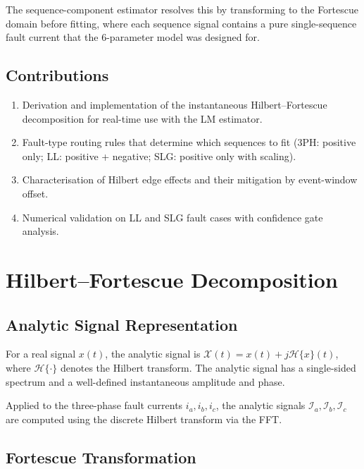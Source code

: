\documentclass[12pt,a4paper]{article}
\theoremstyle{definition}
\theoremstyle{plain}
\begin{document}
The sequence-component estimator resolves this by transforming to the
Fortescue domain before fitting, where each sequence signal contains a
pure single-sequence fault current that the 6-parameter model was designed
for.

\subsection{Contributions}
\begin{enumerate}
  \item Derivation and implementation of the instantaneous Hilbert--Fortescue
        decomposition for real-time use with the LM estimator.
  \item Fault-type routing rules that determine which sequences to fit
        (3PH: positive only; LL: positive + negative; SLG: positive only
        with scaling).
  \item Characterisation of Hilbert edge effects and their mitigation by
        event-window offset.
  \item Numerical validation on LL and SLG fault cases with confidence
        gate analysis.
\end{enumerate}

\section{Hilbert--Fortescue Decomposition}
\label{sec:decomp}

\subsection{Analytic Signal Representation}
\label{sec:decomp:analytic}

For a real signal $x(t)$, the analytic signal is
$\mathcal{X}(t) = x(t) + j\mathcal{H}\{x\}(t)$,
where $\mathcal{H}\{\cdot\}$ denotes the Hilbert transform.  The analytic
signal has a single-sided spectrum and a well-defined instantaneous amplitude
and phase.

Applied to the three-phase fault currents $i_a, i_b, i_c$, the analytic
signals $\mathcal{I}_a, \mathcal{I}_b, \mathcal{I}_c$ are computed using
the discrete Hilbert transform via the FFT.

\subsection{Fortescue Transformation}
\label{sec:decomp:fortescue}
\end{document}
